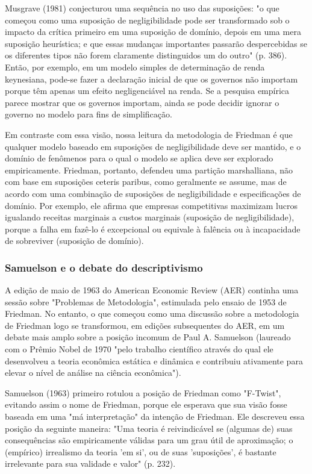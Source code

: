 \documentclass[12pt]{article}
\begin{document}
Musgrave (1981) conjecturou uma sequência no uso das suposições: "o que começou como uma suposição de negligibilidade pode ser transformado sob o impacto da crítica primeiro em uma suposição de domínio, depois em uma mera suposição heurística; e que essas mudanças importantes passarão despercebidas se os diferentes tipos não forem claramente distinguidos um do outro" (p. 386). Então, por exemplo, em um modelo simples de determinação de renda keynesiana, pode-se fazer a declaração inicial de que os governos não importam porque têm apenas um efeito negligenciável na renda. Se a pesquisa empírica parece mostrar que os governos importam, ainda se pode decidir ignorar o governo no modelo para fins de simplificação.

Em contraste com essa visão, nossa leitura da metodologia de Friedman é que qualquer modelo baseado em suposições de negligibilidade deve ser mantido, e o domínio de fenômenos para o qual o modelo se aplica deve ser explorado empiricamente. Friedman, portanto, defendeu uma partição marshalliana, não com base em suposições ceteris paribus, como geralmente se assume, mas de acordo com uma combinação de suposições de negligibilidade e especificações de domínio. Por exemplo, ele afirma que empresas competitivas maximizam lucros igualando receitas marginais a custos marginais (suposição de negligibilidade), porque a falha em fazê-lo é excepcional ou equivale à falência ou à incapacidade de sobreviver (suposição de domínio).

\subsubsection{\textbf{Samuelson e o debate do descriptivismo}}
A edição de maio de 1963 do American Economic Review (AER) continha uma sessão sobre "Problemas de Metodologia", estimulada pelo ensaio de 1953 de Friedman. No entanto, o que começou como uma discussão sobre a metodologia de Friedman logo se transformou, em edições subsequentes do AER, em um debate mais amplo sobre a posição incomum de Paul A. Samuelson (laureado com o Prêmio Nobel de 1970 "pelo trabalho científico através do qual ele desenvolveu a teoria econômica estática e dinâmica e contribuiu ativamente para elevar o nível de análise na ciência econômica").

Samuelson (1963) primeiro rotulou a posição de Friedman como "F-Twist", evitando assim o nome de Friedman, porque ele esperava que sua visão fosse baseada em uma "má interpretação" da intenção de Friedman. Ele descreveu essa posição da seguinte maneira: "Uma teoria é reivindicável se (algumas de) suas consequências são empiricamente válidas para um grau útil de aproximação; o (empírico) irrealismo da teoria 'em si', ou de suas 'suposições', é bastante irrelevante para sua validade e valor" (p. 232).
\end{document}
